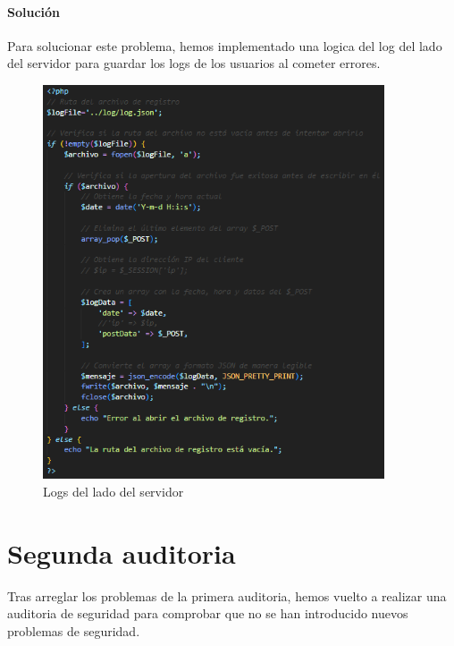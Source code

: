 \documentclass{report}
\begin{document}
                \subsubsection{Solución}
                    Para solucionar este problema, hemos implementado una logica del log del lado del servidor para guardar los logs de los usuarios al cometer errores.
                    \begin{figure}[H]
                        \centering
                        \includegraphics[width=0.9\textwidth]{./img/vulnerabilidades/3.9/2.2.png}
                        \caption{Logs del lado del servidor}
                    \end{figure}
            \clearpage
    \chapter{Segunda auditoria}
        Tras arreglar los problemas de la primera auditoria, hemos vuelto a realizar una auditoria de seguridad para comprobar que no se han introducido nuevos problemas de seguridad.
\end{document}
